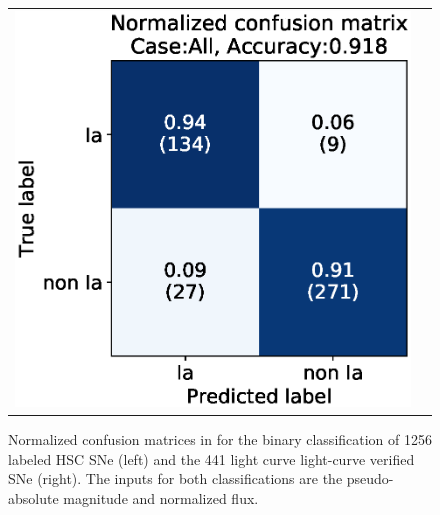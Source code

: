 \documentclass[proof]{pasj01}
\providecommand{\DIFadd}[1]{{\protect\color{blue} \sf #1}} %
\providecommand{\DIFdel}[1]{{\protect\color{red} \scriptsize #1}} %
\providecommand{\DIFaddFL}[1]{\DIFadd{#1}} %
\providecommand{\DIFdelFL}[1]{\DIFdel{#1}} %
\providecommand{\DIFaddbeginFL}{} %
\providecommand{\DIFaddendFL}{} %
\providecommand{\DIFdelbeginFL}{} %
\providecommand{\DIFdelendFL}{} %
\newcommand{\DIFscaledelfig}{0.5}
\newlength{\DIFdelgraphicswidth} %
\newlength{\DIFdelgraphicsheight} %
\newcommand{\DIFaddincludegraphics}[2][]{{\color{blue}\fbox{\DIFOincludegraphics[#1]{#2}}}} %
\newcommand{\DIFdelincludegraphics}[2][]{%
\sbox{\DIFdelgraphicsbox}{\DIFOincludegraphics[#1]{#2}}%
\settoboxwidth{\DIFdelgraphicswidth}{\DIFdelgraphicsbox} %
\settoboxtotalheight{\DIFdelgraphicsheight}{\DIFdelgraphicsbox} %
\scalebox{\DIFscaledelfig}{%
\parbox[b]{\DIFdelgraphicswidth}{\usebox{\DIFdelgraphicsbox}\\[-\baselineskip] \rule{\DIFdelgraphicswidth}{0em}}\llap{\resizebox{\DIFdelgraphicswidth}{\DIFdelgraphicsheight}{%
\setlength{\unitlength}{\DIFdelgraphicswidth}%
\begin{picture}(1,1)%
\thicklines\linethickness{2pt} %
{\color[rgb]{1,0,0}\put(0,0){\framebox(1,1){}}}%
{\color[rgb]{1,0,0}\put(0,0){\line( 1,1){1}}}%
{\color[rgb]{1,0,0}\put(0,1){\line(1,-1){1}}}%
\end{picture}%
}\hspace*{3pt}}} %
} %
\DeclareRobustCommand{\DIFaddbeginFL}{\DIFOaddbeginFL \let\includegraphics\DIFaddincludegraphics} %
\DeclareRobustCommand{\DIFaddendFL}{\DIFOaddendFL \let\includegraphics\DIFOincludegraphics} %
\DeclareRobustCommand{\DIFdelbeginFL}{\DIFOdelbeginFL \let\includegraphics\DIFdelincludegraphics} %
\DeclareRobustCommand{\DIFdelendFL}{\DIFOaddendFL \let\includegraphics\DIFOincludegraphics} %
\begin{document}
\begin{figure}[htbp]
\begin{tabular}{cc}
\begin{minipage}{0.5\hsize}
\begin{center}
                \includegraphics[width=\columnwidth]{figures/10_CM_absolute-magnitude-scaled-flux-remove-y_SNdata_test_190522_2_Flagall_noedge_spec.eps}
            \end{center}
        \end{minipage}
    \end{tabular}
    \caption{%
  Normalized confusion matrices \DIFdelbeginFL \DIFdelFL{in }\DIFdelendFL \DIFaddbeginFL \DIFaddFL{for the }\DIFaddendFL binary classification of 1256 labeled HSC SNe (left) and \DIFaddbeginFL \DIFaddFL{the }\DIFaddendFL 441 \DIFdelbeginFL \DIFdelFL{light curve }\DIFdelendFL \DIFaddbeginFL \DIFaddFL{light-curve }\DIFaddendFL verified SNe (right).
  The inputs for both classifications are \DIFaddbeginFL \DIFaddFL{the }\DIFaddendFL pseudo-absolute magnitude and normalized flux.
}%
    \label{fig:h2_test_CM}
\end{figure}
%
\end{document}
